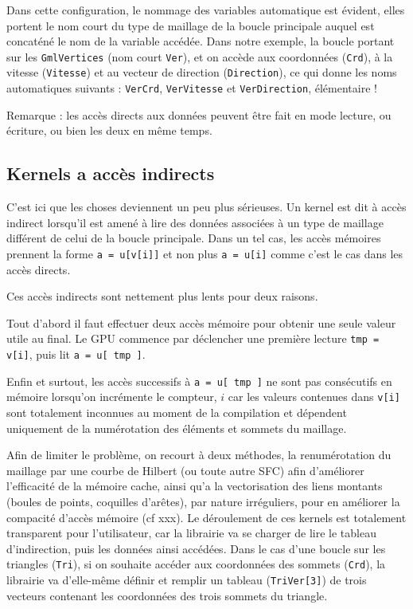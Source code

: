 \documentclass[a4paper,12pt]{article}
\begin{document}
Dans cette configuration, le nommage des variables automatique est évident, elles portent le nom court du type de maillage de la boucle principale auquel est concaténé le nom de la variable accédée.
Dans notre exemple, la boucle portant sur les {\tt GmlVertices} (nom court {\tt Ver}), et on accède aux coordonnées ({\tt Crd}), à la vitesse ({\tt Vitesse}) et au vecteur de direction ({\tt Direction}), ce qui donne les noms automatiques suivants : {\tt VerCrd}, {\tt VerVitesse} et {\tt VerDirection}, élémentaire !

Remarque : les accès directs aux données peuvent être fait en mode lecture, ou écriture, ou bien les deux en même temps.

\subsection{Kernels a accès indirects}
\label{sec:kernels_indirects}
C'est ici que les choses deviennent un peu plus sérieuses.
Un kernel est dit à accès indirect lorsqu'il est amené à lire des données associées à un type de maillage différent de celui de la boucle principale.
Dans un tel cas, les accès mémoires prennent la forme {\tt a = u[v[i]]} et non plus {\tt a = u[i]} comme c'est le cas dans les accès directs.

Ces accès indirects sont nettement plus lents pour deux raisons.

Tout d'abord il faut effectuer deux accès mémoire pour obtenir une seule valeur utile au final.
Le GPU commence par déclencher une première lecture {\tt tmp = v[i]}, puis lit {\tt a = u[ tmp ]}.

Enfin et surtout, les accès successifs à {\tt a = u[ tmp ]} ne sont pas consécutifs en mémoire lorsqu'on incrémente le compteur, $i$ car les valeurs contenues dans {\tt v[i]} sont totalement inconnues au moment de la compilation et dépendent uniquement de la numérotation des éléments et sommets du maillage.

Afin de limiter le problème, on recourt à deux méthodes, la renumérotation du maillage par une courbe de Hilbert (ou toute autre SFC) afin d'améliorer l'efficacité de la mémoire cache, ainsi qu'a la vectorisation des liens montants (boules de points, coquilles d'arêtes), par nature irréguliers, pour en améliorer la compacité d'accès mémoire (cf xxx).
Le déroulement de ces kernels est totalement transparent pour l'utilisateur, car la librairie va se charger de lire le tableau d'indirection, puis les données ainsi accédées.
Dans le cas d'une boucle sur les triangles ({\tt Tri}), si on souhaite accéder aux coordonnées des sommets ({\tt Crd}), la librairie va d'elle-même définir et remplir un tableau ({\tt TriVer[3]}) de trois vecteurs contenant les coordonnées des trois sommets du triangle.
\end{document}
